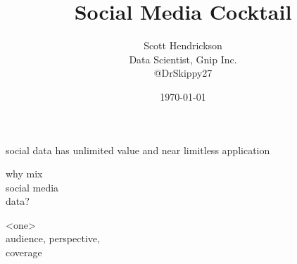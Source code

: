 \documentclass{beamer}
\begin{document}
\title{Social Media Cocktail}  
\author{Scott Hendrickson \\ Data Scientist, Gnip Inc.\\ @DrSkippy27}
\date{\today} 


\begin{frame}
\titlepage
\end{frame}




\begin{frame}
\begin{center}
\Huge social data has unlimited value and near limitless application
\end{center}
\end{frame}

%


\begin{frame}
\begin{center}
{\Huge why mix \\ [5pt] social media \\ [15pt] data? }
\end{center}
\end{frame}


\begin{frame}
\begin{center}
{\Huge <one> \\ [5pt]  audience, perspective, \\  [15pt] coverage }
\end{center}
\end{frame}

\end{document}
